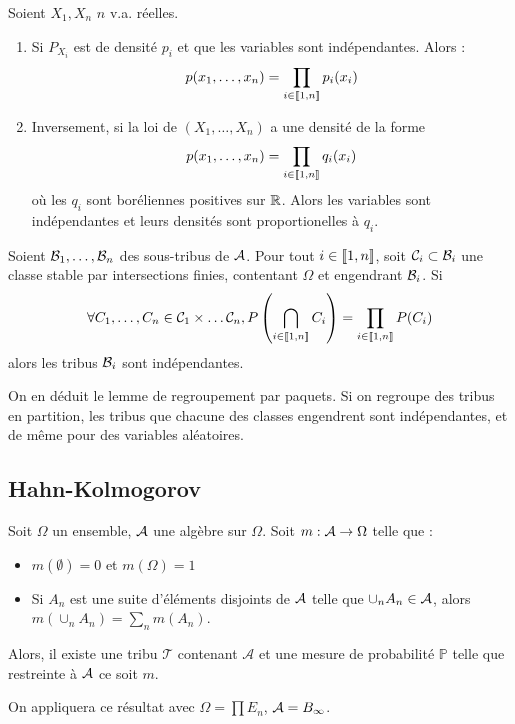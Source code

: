 \documentclass{cours}
\begin{document}
\begin{corollary}
    Soient $X_{1}, X_{n}$ $n$ v.a. réelles.
    \begin{enumerate}
        \item Si $P_{X_{i}}$ est de densité $p_{i}$ et que les variables sont indépendantes. Alors :
              \[p(x_{1}, \ldots, x_{n}) = \prod_{i\in \left\llbracket 1, n\right\rrbracket} p_{i}(x_{i})\]
        \item Inversement, si la loi de $\left(X_{1}, \ldots, X_{n}\right)$ a une densité de la forme \[p(x_{1}, \ldots, x_{n}) = \prod_{i\in \left\llbracket 1, n\right\rrbracket} q_{i}(x_{i})\] où les $q_{i}$ sont boréliennes positives sur $\mathbb{R}$. Alors les variables sont indépendantes et leurs densités sont proportionelles à $q_{i}$.
    \end{enumerate}
\end{corollary}

\begin{proposition}
    Soient $\mathcal{B}_{1}, \ldots, \mathcal{B}_{n}$ des sous-tribus de $\mathcal{A}$. Pour tout $i\in \left\llbracket 1, n\right\rrbracket$, soit $\mathcal{C}_{i} \subset \mathcal{B}_{i}$ une classe stable par intersections finies, contentant $\Omega$ et engendrant $\mathcal{B}_{i}$. Si
    \[
        \forall C_{1}, \ldots, C_{n} \in \mathcal{C}_{1} \times \ldots \mathcal{C}_{n}, P\left(\bigcap_{i \in \left\llbracket 1, n\right\rrbracket} C_{i}\right) = \prod_{i \in \left\llbracket 1, n\right\rrbracket}P(C_{i})
    \]
    alors les tribus $\mathcal{B}_{i}$ sont indépendantes.
\end{proposition}
\begin{corollary}
    On en déduit le lemme de regroupement par paquets. Si on regroupe des tribus en partition, les tribus que chacune des classes engendrent sont indépendantes, et de même pour des variables aléatoires.
\end{corollary}


\subsection{Hahn-Kolmogorov}
\begin{theorem}
    Soit $\Omega$ un ensemble, $\mathcal{A}$ une algèbre sur $\Omega$.
    Soit $m : \mathcal{A} \rightarrow \Omega$ telle que :
    \begin{itemize}
        \item $m(\emptyset) = 0$ et $m(\Omega) = 1$
        \item Si $A_{n}$ est une suite d'éléments disjoints de $\mathcal{A}$ telle que $\cup_{n} A_{n} \in \mathcal{A}$, alors $m\left(\cup_{n} A_{n}\right) = \sum_{n} m(A_{n})$.
    \end{itemize}
    Alors, il existe une tribu $\mathcal{T}$ contenant $\mathcal{A}$ et une mesure de probabilité $\mathbb{P}$ telle que restreinte à $\mathcal{A}$ ce soit $m$.
\end{theorem}
\begin{remark}
    On appliquera ce résultat avec $\Omega = \prod E_{n}$, $\mathcal{A} = B_{\infty}$.
\end{remark}
\end{document}
